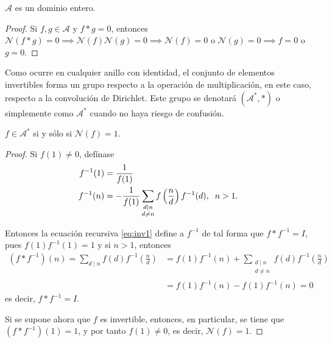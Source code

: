 \begin{theorem}
$\mathcal{A}$ es un dominio entero. 
\end{theorem}
\begin{proof}
Si $f,g \in \mathcal{A}$ y $f*g=0$, entonces $\mathcal{N}(f*g)=0 \implies \mathcal{N}(f)\mathcal{N}(g)=0 \implies \mathcal{N}(f)=0$ o $\mathcal{N}(g)=0 \implies f=0$ o $g=0$.
\end{proof}

\begin{remark}
Como ocurre en cualquier anillo con identidad, el conjunto de elementos invertibles forma un grupo respecto a la operación de multiplicación, en este caso, respecto a la convolución de Dirichlet. Este grupo se denotará $(\mathcal{A}^*,*)$ o simplemente como $\mathcal{A}^*$ cuando no haya riesgo de confusión.
\end{remark}

\begin{proposition}\label{prop:str1}
$f \in \mathcal{A}^*$ si y sólo si $\mathcal{N}(f)=1$.
\end{proposition}
\begin{proof}
Si $f(1) \ne 0$, defínase
\begin{equation}\label{eq:inv1}
    \begin{split}
	f^{-1}(1) &= \frac{1}{f(1)} \\
	f^{-1}(n) &= -\frac{1}{f(1)} \sum_{\substack{d \mid n \\ d \ne n}} f \left( \frac{n}{d} \right) f^{-1}(d), \hspace{0.2cm} n>1.
\end{split}
\end{equation}

Entonces la ecuación recursiva \eqref{eq:inv1} define a $f^{-1}$ de tal forma que $f*f^{-1} = I$, pues $f(1)f^{-1}(1)=1$ y si $n>1$, entonces
\begin{align*}
	(f*f^{-1})(n) = \sum_{d \mid n} f(d)f^{-1}\left( \frac{n}{d} \right) &= f(1)f^{-1}(n) + \sum_{\substack{d \mid n \\ d \ne n }} f(d)f^{-1}\left( \frac{n}{d} \right) \\
	&= f(1)f^{-1}(n)-f(1)f^{-1}(n) = 0
\end{align*}
es decir, $f*f^{-1}=I$.
\bigskip

Si se supone ahora que $f$ es invertible, entonces, en particular, se tiene que $(f*f^{-1})(1)=1$,  y por tanto $f(1) \ne 0$, es decir, $\mathcal{N}(f)=1$.
\end{proof}

